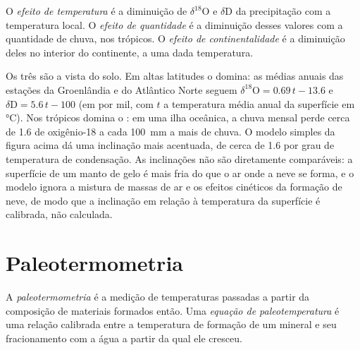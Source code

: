 \begin{definition}\label{def:b3:stable-isotopes:effects}
O \emph{efeito de temperatura} é a
diminuição de $\delta^{18}\mathrm O$ e $\delta\mathrm D$ da precipitação com a
temperatura local. O \emph{efeito de quantidade} é a
diminuição desses valores com a quantidade de chuva, nos trópicos. O \emph{efeito de
continentalidade} é a diminuição deles no interior do continente, a uma dada
temperatura.
\end{definition}

Os três são a  vista do solo. Em altas latitudes
o  domina: as médias anuais das estações da Groenlândia e do
Atlântico Norte seguem $\delta^{18}\mathrm O = 0.69\,t - 13.6$ e $\delta\mathrm D =
5.6\,t - 100$ (em por mil, com $t$ a temperatura média anual da superfície em
\unit{\celsius}). Nos trópicos domina o : em uma ilha oceânica,
a chuva mensal perde cerca de \qty{1.6}{\permil} de oxigênio-18 a cada
\qty{100}{mm} a mais de chuva. O modelo simples da figura acima dá uma inclinação mais
acentuada, de cerca de \qty{1.6}{\permil} por grau de temperatura de condensação.
As inclinações não são diretamente comparáveis: a superfície de um manto de gelo é mais fria
do que o ar onde a neve se forma, e o modelo ignora a mistura de massas de ar
e os efeitos cinéticos da formação de neve, de modo que a inclinação em relação à
temperatura da superfície é calibrada, não calculada.

\section{Paleotermometria}\label{sec:b3:stable-isotopes:palaeothermometry}

\begin{definition}
\label{def:b3:stable-isotopes:palaeothermometry}
A \emph{paleotermometria} é a medição de temperaturas passadas a partir da
composição de materiais formados então. Uma
\emph{equação de paleotemperatura} é uma
relação calibrada entre a temperatura de formação de um mineral e seu
fracionamento com a água a partir da qual ele cresceu.
\end{definition}

